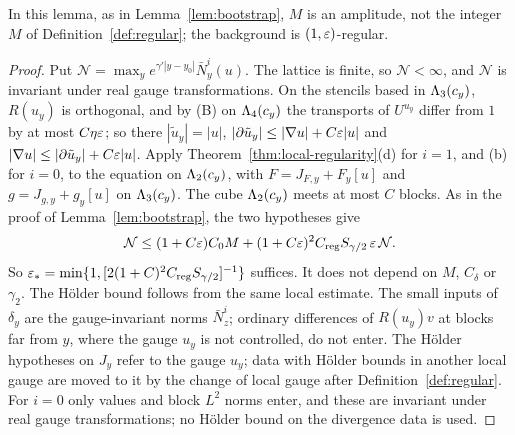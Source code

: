 In this lemma, as in Lemma~\ref{lem:bootstrap}, $M$ is an amplitude, not the integer $M$ of Definition~\ref{def:regular}; the background is $(1,\varepsilon)$-regular.

\begin{proof}
Put $\mathcal N=\max_ye^{\gamma'|y-y_0|}\bar N^i_y(u)$. The lattice is finite, so $\mathcal N<\infty$, and $\mathcal N$ is invariant under real gauge transformations. On the stencils based in $\Lambda_3(c_y)$, $R(u_y)$ is orthogonal, and by (B) on $\Lambda_4(c_y)$ the transports of $U^{u_y}$ differ from $1$ by at most $C\eta\varepsilon$; so there $|\tilde u_y|=|u|$, $|\partial\tilde u_y|\le|\nabla u|+C\varepsilon|u|$ and $|\nabla u|\le|\partial\tilde u_y|+C\varepsilon|u|$. Apply Theorem~\ref{thm:local-regularity}(d) for $i=1$, and (b) for $i=0$, to the equation on $\Lambda_2(c_y)$, with $F=J_{F,y}+F_y[u]$ and $g=J_{g,y}+g_y[u]$ on $\Lambda_3(c_y)$. The cube $\Lambda_2(c_y)$ meets at most $C$ blocks. As in the proof of Lemma~\ref{lem:bootstrap}, the two hypotheses give
\[
\mathcal N\le(1+C\varepsilon)C_0M+(1+C\varepsilon)^2C_{\rm reg}S_{\gamma/2}\,\varepsilon\,\mathcal N .
\]
So $\varepsilon_*=\min\{1,[2(1+C)^2C_{\rm reg}S_{\gamma/2}]^{-1}\}$ suffices. It does not depend on $M$, $C_\delta$ or $\gamma_2$. The H\"older bound follows from the same local estimate. The small inputs of $\delta_y$ are the gauge-invariant norms $\bar N^i_z$; ordinary differences of $R(u_y)v$ at blocks far from $y$, where the gauge $u_y$ is not controlled, do not enter. The H\"older hypotheses on $J_y$ refer to the gauge $u_y$; data with H\"older bounds in another local gauge are moved to it by the change of local gauge after Definition~\ref{def:regular}. For $i=0$ only values and block $L^2$ norms enter, and these are invariant under real gauge transformations; no H\"older bound on the divergence data is used.
\end{proof}
